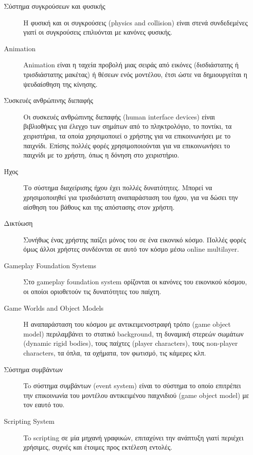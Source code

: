 \begin{description}
\item [Σύστημα συγκρούσεων και φυσικής]Η φυσική και οι συγκρούσεις (physics and collision) είναι στενά συνδεδεμένες γιατί οι συγκρούσεις επιλυόνται με κανόνες φυσικής.

\item [Animation]Animation είναι η ταχεία προβολή μιας σειράς από εικόνες (δισδιάστατης ή τρισδιάστατης μακέτας) ή θέσεων ενός μοντέλου, έτσι ώστε να δημιουργείται η ψευδαίσθηση της κίνησης.

\item [Συσκευές ανθρώπινης διεπαφής]Οι συσκευές ανθρώπινης διεπαφής (human interface devices) είναι βιβλιοθήκες για έλεγχο των σημάτων από το πληκτρολόγιο, το ποντίκι, τα χειριστήρια, τα οποία χρησιμοποιεί ο χρήστης για να επικοινωνήσει με το παιχνίδι. Επίσης πολλές φορές χρησιμοποιούνται για να επικοινωνήσει το παιχνίδι με το χρήστη, όπως η δόνηση στο χειριστήριο.

\item [Ήχος]Το σύστημα διαχείρισης ήχου έχει πολλές δυνατότητες. Μπορεί να χρησιμοποιηθεί για τρισδιάστατη αναπαράσταση του ήχου, για να δώσει την αίσθηση του βάθους και της απόστασης στον χρήστη.

\item [Δικτύωση]Συνήθως ένας χρήστης παίζει μόνος του σε ένα εικονικό κόσμο. Πολλές φορές όμως άλλοι χρήστες συνδέονται σε αυτό τον κόσμο μέσω online multilayer.

\item [Gameplay Foundation Systems]Στο gameplay foundation system ορίζονται οι κανόνες του εικονικού κόσμου, οι οποίοι οριοθετούν τις δυνατότητες του παίχτη.

\item [Game Worlds and Object Models]Η αναπαράσταση του κόσμου με αντικειμενοστραφή τρόπο (game object model) περιλαμβάνει το στατικό background, τη δυναμική στερεών σωμάτων (dynamic rigid bodies), τους παίχτες (player characters), τους non-player characters, τα όπλα, τα οχήματα, τον φωτισμό, τις κάμερες κλπ.

\item [Σύστημα συμβάντων]To σύστημα συμβάντων (event system) είναι το σύστημα το οποίο επιτρέπει την επικοινωνία του μοντέλου αντικειμένου παιχνιδιού (game object model) με τον εαυτό του.

\item [Scripting System]To scripting σε μία μηχανή γραφικών, επιταχύνει την ανάπτυξη γιατί περιέχει χρήσιμες, συχνές και έτοιμες προς εκτέλεση εντολές.


\end{description}
